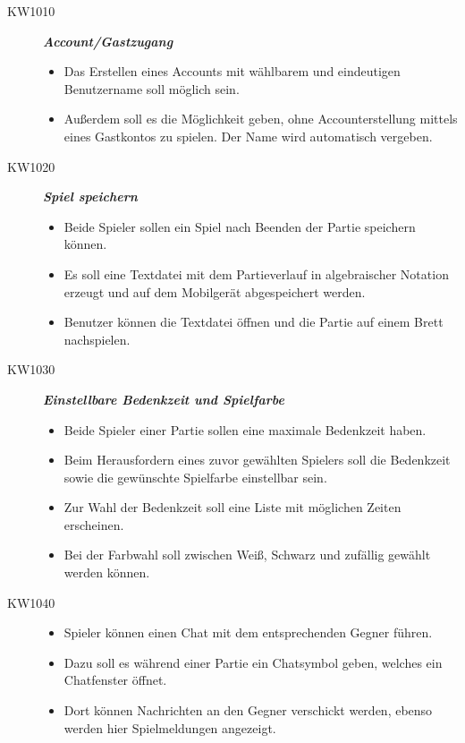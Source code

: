 \documentclass[parskip=full]{scrartcl}
\begin{document}
\begin{description}

	\item[KW1010] \textbf{\textit{Account/Gastzugang}}
	\begin{itemize}
		\item Das Erstellen eines Accounts mit wählbarem und eindeutigen Benutzername soll 		möglich sein.
		\item Außerdem soll es die Möglichkeit geben, ohne Accounterstellung mittels eines 		Gastkontos zu spielen. Der Name wird automatisch vergeben.		
	\end{itemize}
	
	\item[KW1020] \textbf{\textit{Spiel speichern}}
	\begin{itemize}
		\item Beide Spieler sollen ein Spiel nach Beenden der Partie speichern können.
		\item Es soll eine Textdatei mit dem Partieverlauf in algebraischer \gls{Notation} erzeugt und auf dem Mobilgerät abgespeichert werden.
		\item Benutzer können die Textdatei öffnen und die Partie auf einem Brett nachspielen.
	\end{itemize}
	
	\item[KW1030] \textbf{\textit{Einstellbare Bedenkzeit und Spielfarbe}}
	\begin{itemize}
		\item Beide Spieler einer Partie sollen eine maximale \gls{Bedenkzeit} haben.
		\item Beim Herausfordern eines zuvor gewählten Spielers soll die \gls{Bedenkzeit} sowie die gewünschte Spielfarbe einstellbar sein.
		\item Zur Wahl der \gls{Bedenkzeit} soll eine Liste mit möglichen Zeiten erscheinen.
		\item Bei der Farbwahl soll zwischen Weiß, Schwarz und zufällig gewählt werden können.
	\end{itemize}
	
	\item[KW1040] 
	\begin{itemize} \textbf{\textit{Chat}}
		\item \gls{Spieler} können einen Chat mit dem entsprechenden Gegner führen.
		\item Dazu soll es während einer Partie ein Chatsymbol geben, welches ein Chatfenster öffnet.
		\item Dort können Nachrichten an den Gegner verschickt werden, ebenso werden hier Spielmeldungen angezeigt.
	\end{itemize}
	

\end{description}
\end{document}
